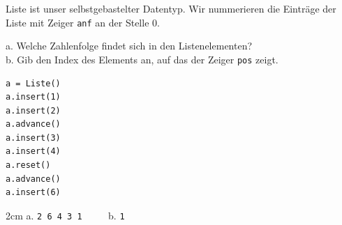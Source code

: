 \question[2]
Liste ist unser selbstgebastelter Datentyp.
Wir nummerieren die Einträge der Liste mit Zeiger \texttt{anf} an der Stelle 0.

a. Welche Zahlenfolge findet sich in den Listenelementen? \\
b. Gib den Index des Elements an, auf das der Zeiger \texttt{pos} zeigt.
\begin{lstlisting}
a = Liste()
a.insert(1)
a.insert(2)
a.advance()
a.insert(3)
a.insert(4)
a.reset()
a.advance()
a.insert(6)
\end{lstlisting}

\begin{solutionbox}{2cm}
a. \texttt{2 6 4 3 1 } ~~~ b. \texttt{1}
\end{solutionbox}
